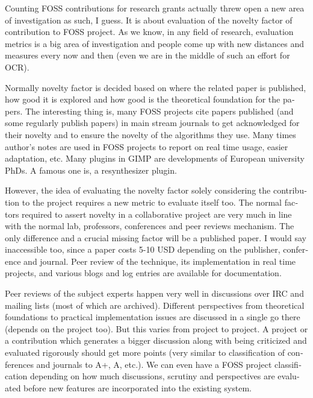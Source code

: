 \begin{english}
\vskip 2pt
Counting FOSS contributions for research grants actually threw open
a new area of investigation as such, I guess. It is about evaluation of the novelty
factor of contribution to FOSS project. As we know, in any field of research,
evaluation metrics is a big area of investigation and people come up with new
distances and measures every now and then (even we are in the middle of
such an effort for OCR). 

Normally novelty factor is decided based on where
the related paper is published, how good it is explored and how good is the
theoretical foundation for the papers. The interesting thing is, many FOSS
projects cite papers published (and some regularly publish papers) in main
stream journals to get acknowledged for their novelty and to ensure the novelty of
the algorithms they use. Many times author's notes are used in FOSS projects to
report on real time usage, easier adaptation, etc. Many plugins in GIMP are
developments of European university PhDs. A famous one is, a resynthesizer plugin.

However, the idea of evaluating the novelty factor solely considering the contribution
to the project requires a new metric to evaluate itself too. The normal factors
required to assert novelty in a collaborative project are very
much in line with the normal lab, professors, conferences and peer reviews mechanism.
The only difference and a crucial missing factor will be a published paper. I would
say inaccessible too, since a paper costs 5-10 USD depending on the publisher,
conference and journal. Peer review of the technique,
its implementation in real time projects, and various blogs and log entries are
available for documentation.

Peer reviews of the subject experts happen very well in discussions
over IRC and mailing lists (most of which are archived). Different perspectives
from theoretical foundations to practical implementation issues are discussed
in a single go there (depends on the project too). But this varies from project
to project. A project or a contribution which generates a bigger discussion
along with being criticized and evaluated rigorously should get more points (very similar
to classification of conferences and journals to A+, A, etc.).  We can even
have a FOSS project classification depending on how much discussions, scrutiny
and perspectives are evaluated before new features are incorporated into the
existing system.


\end{english}
